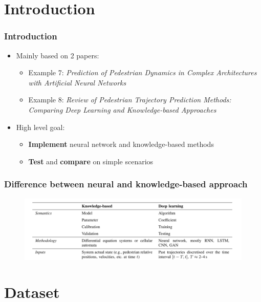 \section{Introduction}

\begin{frame}
    \frametitle{Introduction}
    \begin{itemize}
        \item Mainly based on 2 papers:
        \begin{itemize}
            \item Example 7: \textit{Prediction of Pedestrian Dynamics in Complex Architectures with Artificial Neural Networks}
            \item Example 8: \textit{Review of Pedestrian Trajectory Prediction Methods: Comparing Deep Learning and Knowledge-based Approaches}
        \end{itemize}
        \item High level goal:
        \begin{itemize}
            \item \textbf{Implement} neural network and knowledge-based methods
            \item \textbf{Test} and \textbf{compare} on simple scenarios
        \end{itemize}
    \end{itemize}
\end{frame}

\begin{frame}
    \frametitle{Difference between neural and knowledge-based approach}
    \begin{figure}
        \centering
    \includegraphics[width=1\textwidth]{Images/cappaper.png}
    \end{figure}
\end{frame}

\section{Dataset}

